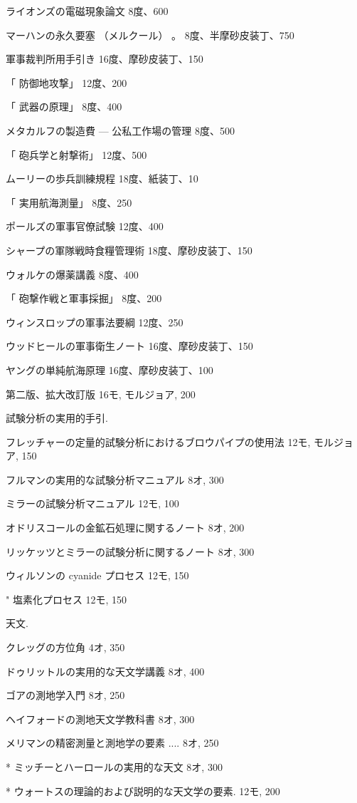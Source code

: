 \documentclass[a4paper,11pt,openany]{ltjsbook}
\begin{document}
ライオンズの電磁現象論文 8度、600

マーハンの永久要塞 （メルクール） 。 8度、半摩砂皮装丁、750

軍事裁判所用手引き 16度、摩砂皮装丁、150

「      防御地攻撃」 12度、200

「      武器の原理」 8度、400

メタカルフの製造費 — 公私工作場の管理 8度、500

「      砲兵学と射撃術」 12度、500

ムーリーの歩兵訓練規程 18度、紙装丁、10

「      実用航海測量」 8度、250

ポールズの軍事官僚試験 12度、400

シャープの軍隊戦時食糧管理術 18度、摩砂皮装丁、150

ウォルケの爆薬講義 8度、400

「      砲撃作戦と軍事採掘」 8度、200

ウィンスロップの軍事法要綱 12度、250

ウッドヒールの軍事衛生ノート 16度、摩砂皮装丁、150

ヤングの単純航海原理 16度、摩砂皮装丁、100

第二版、拡大改訂版 16モ, モルジョア, 200

試験分析の実用的手引.

フレッチャーの定量的試験分析におけるブロウパイプの使用法 12モ, モルジョア, 150

フルマンの実用的な試験分析マニュアル 8オ, 300

ミラーの試験分析マニュアル 12モ, 100

オドリスコールの金鉱石処理に関するノート 8オ, 200

リッケッツとミラーの試験分析に関するノート 8オ, 300

ウィルソンの cyanide プロセス 12モ, 150

"       塩素化プロセス    12モ, 150

天文.

クレッグの方位角 4オ, 350

ドゥリットルの実用的な天文学講義 8オ, 400

ゴアの測地学入門 8オ, 250

ヘイフォードの測地天文学教科書 8オ, 300

メリマンの精密測量と測地学の要素 .... 8オ, 250

* ミッチーとハーロールの実用的な天文 8オ, 300

* ウォートスの理論的および説明的な天文学の要素. 12モ, 200
\end{document}
